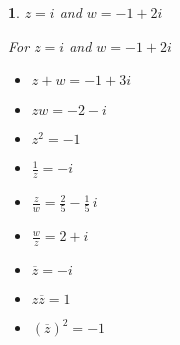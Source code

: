\documentclass{amsbook}
\newtheorem{exc}{}
\newenvironment{ex}{\begin{exc}\normalfont}{\end{exc}}
\numberwithin{section}{chapter}
\numberwithin{equation}{chapter}
\begin{document}
\begin{ex}
	 $z = i$ and $w = -1+2i$

	\begin{sol}
		For  $z = i$ and $w = -1+2i$
		
		\begin{multicols}{3}
			
			\begin{itemize}
				
				\item $z+w = -1+3i$
				
				\item $zw = -2-i$
				
				\item $z^2 = -1$
				
			\end{itemize}
			
		\end{multicols}
		
		\begin{multicols}{3}
			
			\begin{itemize}
				
				\item $\frac{1}{z} = -i$
				
				\item $\frac{z}{w} = \frac{2}{5} - \frac{1}{5} \, i$
				
				\item $\frac{w}{z} = 2+i$
				
			\end{itemize}
			
		\end{multicols}
		
		\begin{multicols}{3}
			
			\begin{itemize}
				
				\item $\overline{z} = -i$
				
				\item $z\overline{z} = 1$
				
				\item $(\overline{z})^2 = -1$
				
			\end{itemize}
			
		\end{multicols}
		
	\end{sol}
\end{ex}
\end{document}
